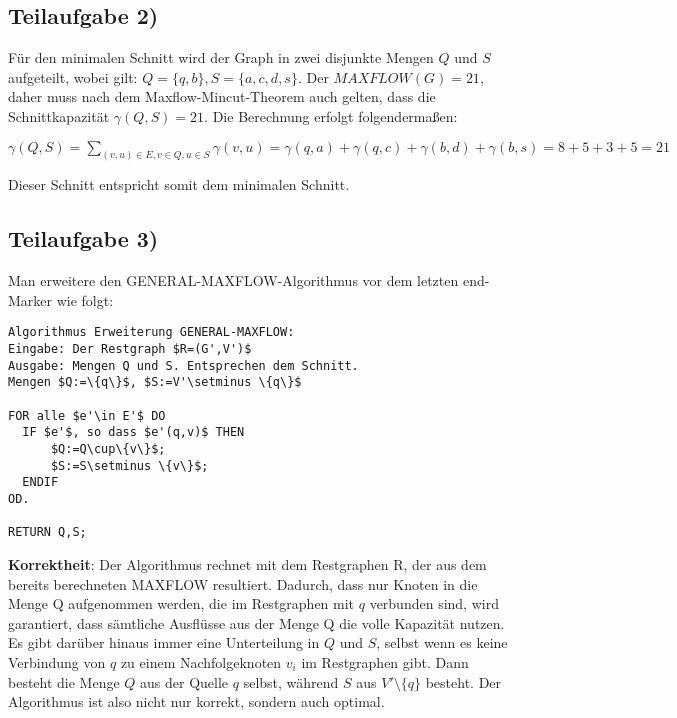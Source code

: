 \documentclass[a4paper, fontsize=10pt]{scrartcl}
\begin{document}
\subsection*{Teilaufgabe 2)}
Für den minimalen Schnitt wird der Graph in zwei disjunkte Mengen $Q$ und $S$ aufgeteilt, wobei gilt:
$Q=\{q,b\}, S=\{a,c,d,s\}.$
Der $MAXFLOW(G)=21$, daher muss nach dem Maxflow-Mincut-Theorem auch gelten, dass die Schnittkapazität $\gamma(Q,S)=21$. Die Berechnung erfolgt folgendermaßen:\smallskip

$\gamma(Q,S)=\sum_{(v,u)\in E, v\in Q, u \in S}\gamma(v,u)=\gamma(q,a)+\gamma(q,c)+\gamma(b,d)+\gamma(b,s)=8+5+3+5=21$

Dieser Schnitt entspricht somit dem minimalen Schnitt.

\subsection*{Teilaufgabe 3)}


Man erweitere den GENERAL-MAXFLOW-Algorithmus vor dem letzten end-Marker wie folgt:
\begin{lstlisting}[mathescape]
Algorithmus Erweiterung GENERAL-MAXFLOW:     
Eingabe: Der Restgraph $R=(G',V')$
Ausgabe: Mengen Q und S. Entsprechen dem Schnitt.
Mengen $Q:=\{q\}$, $S:=V'\setminus \{q\}$

FOR alle $e'\in E'$ DO
  IF $e'$, so dass $e'(q,v)$ THEN
      $Q:=Q\cup\{v\}$;
      $S:=S\setminus \{v\}$;
  ENDIF
OD.

RETURN Q,S;

\end{lstlisting}
\bigskip

\textbf{Korrektheit}: Der Algorithmus rechnet mit dem Restgraphen R, der aus dem bereits berechneten MAXFLOW resultiert. Dadurch, dass nur Knoten in die Menge Q aufgenommen werden, die im Restgraphen mit $q$ verbunden sind, wird garantiert, dass sämtliche Ausflüsse aus der Menge Q die volle Kapazität nutzen. Es gibt darüber hinaus immer eine Unterteilung in $Q$ und $S$, selbst wenn es keine Verbindung von $q$ zu einem Nachfolgeknoten $v_i$ im Restgraphen gibt. Dann besteht die Menge $Q$ aus der Quelle $q$ selbst, während $S$ aus $V' \setminus \{q\}$ besteht. Der Algorithmus ist also nicht nur korrekt, sondern auch optimal.\bigskip
\end{document}
